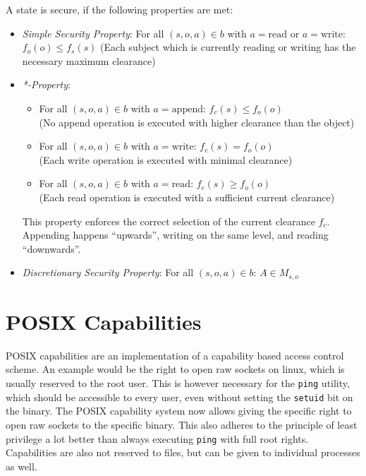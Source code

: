 A state is secure, if the following properties are met:
\begin{itemize}
    \item \emph{Simple Security Property}: For all $(s, o, a) \in b$ with
          $a=\text{read}$ or $a=\text{write}$: $f_o(o) \leq f_s(s)$ (Each
          subject which is currently reading or writing has the necessary
          maximum clearance)
    \item \emph{*-Property}:
          \begin{itemize}
              \item For all $(s,o,a)\in b$ with $a=\text{append}$: $f_c(s) \leq
                        f_o(o)$ \\ (No append operation is executed with higher
                        clearance than the object)
              \item For all $(s,o,a)\in b$ with $a=\text{write}$: $f_c(s) =
                        f_o(o)$ \\ (Each write operation is executed with
                        minimal clearance)
              \item For all $(s,o,a)\in b$ with $a=\text{read}$: $f_c(s) \geq
                        f_o(o)$ \\ (Each read operation is executed with a
                        sufficient current clearance)
          \end{itemize}
          This property enforces the correct selection of the current clearance
          $f_c$. Appending happens ``upwards'', writing on the same level, and
          reading ``downwards''.
    \item \emph{Discretionary Security Property}: For all $(s,o,a) \in b$: $A
              \in M_{s,o}$
\end{itemize}

\section{POSIX Capabilities}
POSIX capabilities are an implementation of a capability based access control
scheme. An example would be the right to open raw sockets on linux, which is
usually reserved to the root user. This is however necessary for the
\texttt{ping} utility, which should be accessible to every user, even without
setting the \texttt{setuid} bit on the binary. The POSIX capability system now
allows giving the specific right to open raw sockets to the specific binary.
This also adheres to the principle of least privilege a lot better than always
executing \texttt{ping} with full root rights. Capabilities are also not
reserved to files, but can be given to individual processes as well.
